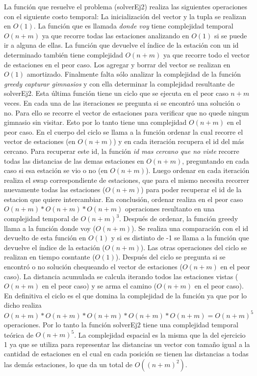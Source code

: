       La función que resuelve el problema (solverEj2) realiza las siguientes operaciones con el siguiente costo temporal: La inicialización del vector y la tupla se realizan en $O(1)$. La función que es llamada \textit{donde voy} tiene complejidad temporal $O(n+m)$ ya que recorre todas las estaciones analizando en $O(1)$ si se puede ir a alguna de ellas. La función que devuelve el índice de la estación con un id determinado también tiene complejidad $O(n+m)$ ya que recorre todo el vector de estaciones en el peor caso. Los agregar y borrar del vector se realizan en $O(1)$ amortizado. Finalmente falta sólo analizar la complejidad de la función \textit{greedy capturar gimnasios} y con ella determinar la complejidad resultante de solverEj2. 
      Esta última función tiene un ciclo que se ejecuta en el peor caso $n+m$ veces. En cada una de las iteraciones se pregunta si se encontró una solución o no. Para ello se recorre el vector de estaciones para verificar que no quede ningun gimnasio sin visitar. Esto por lo tanto tiene una complejidad $O(n+m)$ en el peor caso. En el cuerpo del ciclo se llama a la función ordenar la cual recorre el vector de estaciones (en $O(n+m)$) y en cada iteración recupera el id del más cercano. Para recuperar este id, la función \textit{id mas cercano que no viste} recorre todas las distancias de las demas estaciones en $O(n+m)$, preguntando en cada caso si esa estación se vio o no (en $O(n+m)$). Luego ordenar en cada iteración realiza el swap correspondiente de estaciones, que para el mismo necesita recorrer nuevamente todas las estaciones ($O(n+m)$) para poder recuperar el id de la estacion que quiere intercambiar. En conclusión, ordenar realiza en el peor caso $O(n+m)*O(n+m)*O(n+m)$ operaciones resultanto en una complejidad temporal de $O(n+m)^3$. 
      Después de ordenar, la función greedy llama a la función donde voy ($O(n+m)$). Se realiza una comparación con el id devuelto de esta función en $O(1)$ y si es distinto de -1 se llama a la función que devuelve el índice de la estación ($O(n+m)$). Las otras operaciones del ciclo se realizan en tiempo cosntante ($O(1)$). 
      Después del ciclo se pregunta si se encontró o no solución chequeando el vector de estaciones ($O(n+m)$ en el peor caso). La distancia acumulada se calcula iterando todos las estaciones vistas ($O(n+m)$ en el peor caso) y se arma el camino ($O(n+m)$ en el peor caso). En definitiva el ciclo es el que domina la complejidad de la función ya que por lo dicho realiza $O(n+m)*O(n+m)*O(n+m)*O(n+m)*O(n+m) = O(n+m)^5$ operaciones.
      Por lo tanto la función solverEj2 tiene una complejidad temporal teórica de $O(n+m)^5$. La complejidad espacial es la misma que la del ejercicio 1 ya que se utiliza para representar las distancias un vector con tamaño igual a la cantidad de estaciones en el cual en cada posición se tienen las distancias a todas las demás estaciones, lo que da un total de $O((n+m)^2)$. 

